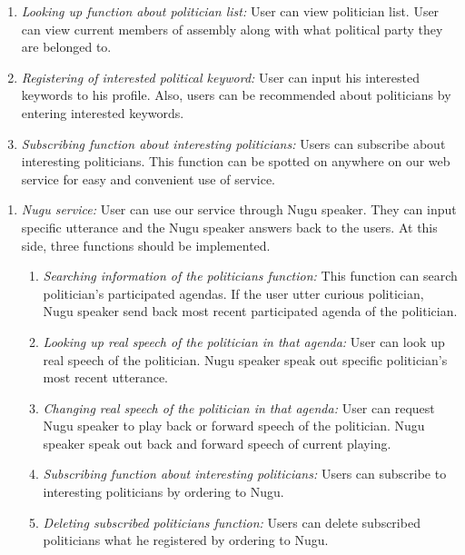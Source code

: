 \documentclass[conference]{IEEEtran}
\begin{document}
\begin{enumerate}
\begin{enumerate}
        \item \textit {Looking up function about politician list:} User can view politician list. User can view current members of assembly along with what political party they are belonged to.\\
       
        \item \textit {Registering of interested political keyword:} User can input his interested keywords to his profile. Also, users can be recommended about politicians by entering interested keywords. \\
       
        \item \textit {Subscribing function about interesting politicians:} Users can subscribe about interesting politicians. This function can be spotted on anywhere on our web service for easy and convenient use of service.\\
        \end{enumerate}
    \end{enumerate}

    \begin{enumerate}
        \item \textit{Nugu service:} User can use our service through Nugu speaker. They can input specific utterance and the Nugu speaker answers back to the users. At this side, three functions should be implemented.\\
       
        \begin{enumerate}
        \item \textit{Searching information of the politicians function:} This function can search politician’s participated agendas. If the user utter curious politician, Nugu speaker send back most recent participated agenda of the politician.\\
       
        \item \textit{Looking up real speech of the politician in that agenda:} User can look up real speech of the politician. Nugu speaker speak out specific politician’s most recent utterance.\\
       
        \item \textit{Changing real speech of the politician in that agenda:} User can request Nugu speaker to play back or forward speech of the politician. Nugu speaker speak out back and forward speech of current playing.\\
       
        \item \textit {Subscribing function about interesting politicians:} Users can subscribe to interesting politicians by ordering to Nugu.\\
       
        \item \textit {Deleting subscribed politicians function:} Users can delete subscribed politicians what he registered by ordering to Nugu. \\
           \end{enumerate}
    \end{enumerate}
   
\end{document}
